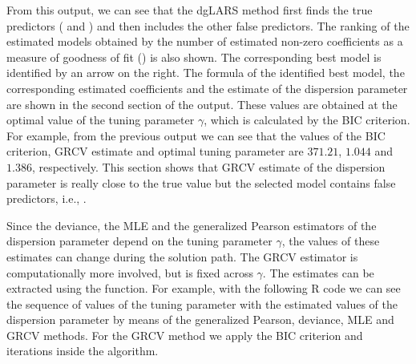 From this output, we can see that the dgLARS method first finds the true predictors ( and ) and then includes the other false predictors. The ranking of the estimated models obtained by the number of estimated non-zero coefficients as a measure of goodness of fit () is also shown. The corresponding best model is identified by an arrow on the right. The formula of the identified best model, the corresponding estimated coefficients and the estimate of the dispersion parameter are shown in the second section of the output. These values are obtained at the optimal value of the tuning parameter $\gamma$, which is calculated by the BIC criterion. For example, from the previous output we can see that the values of the BIC criterion, GRCV estimate and optimal tuning parameter are $371.21$, $1.044$ and $1.386$, respectively. This section shows that GRCV estimate of the dispersion parameter is really close to the true value but the selected model contains false predictors, i.e., .


Since the deviance, the MLE and the generalized Pearson estimators of the dispersion parameter depend on the tuning parameter $\gamma$, the values of these estimates can change during the solution path. The GRCV estimator is computationally more involved, but is fixed across $\gamma$. The estimates can be extracted using the  function. For example, with the following {R} code we can see the sequence of values of the tuning parameter with the estimated values of the dispersion parameter by means of the generalized Pearson, deviance, MLE and GRCV methods. For the GRCV method we apply the BIC criterion and   iterations inside the algorithm.

